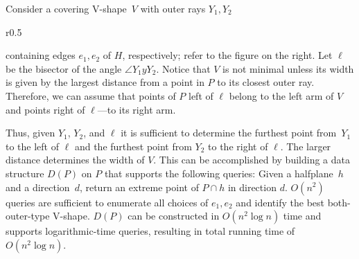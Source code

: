 \documentclass{llncs}
\begin{document}
Consider a covering V-shape~$V$ with outer rays $Y_1,Y_2$
\begin{wrapfigure}[8]{r}{0.5 \textwidth}
\end{wrapfigure}
containing edges $e_1,e_2$ of $H$, respectively; refer to the figure
on the right.  Let $\ell$ be the bisector of the angle $\angle Y_1yY_2$. 
Notice that $V$ is not minimal unless its width is given by the
largest distance from a point in $P$ to its closest outer ray.
Therefore, we can assume that points of $P$ left of $\ell$ belong to the
left arm of $V$ and points right of $\ell$---to its right arm.



Thus, given $Y_1$, $Y_2$, and $\ell$ it is sufficient to determine the
furthest point from~$Y_1$ to the left of $\ell$ and the furthest point
from $Y_2$ to the right of $\ell$.  The larger distance determines the
width of $V$.  This can be accomplished by building a data structure
$D(P)$ on $P$ that supports the following queries: Given a
halfplane~$h$ and a direction~$d$, return an extreme point of $P \cap
h$ in direction $d$.  $O(n^2)$ queries are sufficient to enumerate all
choices of $e_1,e_2$ and identify the best both-outer-type V-shape.
$D(P)$ can be constructed in $O(n^2 \log n)$ time and supports
logarithmic-time queries, resulting in total running time of
$O(n^2\log n)$.
\end{document}
